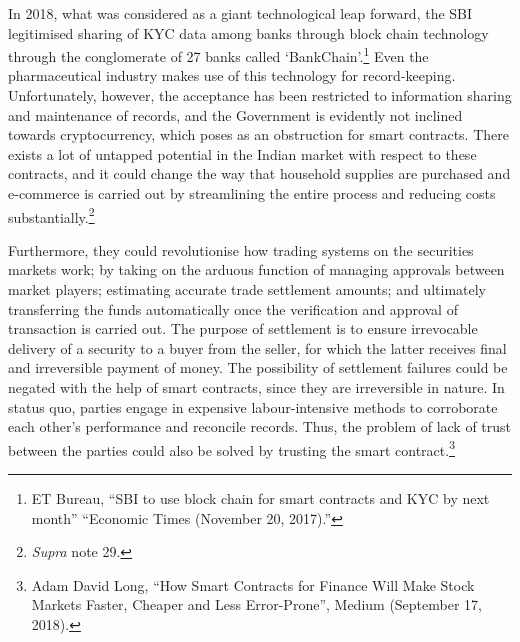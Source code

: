 \begin{multicols}{2}

\noi
In 2018, what was considered as a giant technological leap forward, the SBI legitimised
sharing of KYC data among banks through block chain technology through the conglomerate
of 27 banks called ‘BankChain’.\footnote{ET Bureau, “SBI to use block chain for smart contracts and KYC by next month” “Economic Times
(November 20, 2017).”} Even the pharmaceutical industry makes use of this technology for record-keeping. Unfortunately, however, the acceptance has been restricted to
information sharing and maintenance of records, and the Government is evidently not
inclined towards cryptocurrency, which poses as an obstruction for smart contracts. There
exists a lot of untapped potential in the Indian market with respect to these contracts, and it
could change the way that household supplies are purchased and e-commerce is carried out
by streamlining the entire process and reducing costs substantially.\footnote{\textit{Supra} note 29. }

\noi
Furthermore, they could revolutionise how trading systems on the securities markets work;
by taking on the arduous function of managing approvals between market players; estimating
accurate trade settlement amounts; and ultimately transferring the funds automatically once
the verification and approval of transaction is carried out. The purpose of settlement is to
ensure irrevocable delivery of a security to a buyer from the seller, for which the latter
receives final and irreversible payment of money. The possibility of settlement failures could
be negated with the help of smart contracts, since they are irreversible in nature. In status
quo, parties engage in expensive labour-intensive methods to corroborate each other’s
performance and reconcile records. Thus, the problem of lack of trust between the parties
could also be solved by trusting the smart contract.\footnote{Adam David Long, “How Smart Contracts for Finance Will Make Stock Markets Faster, Cheaper and Less
Error-Prone”, Medium (September 17, 2018).}



\end{multicols}
